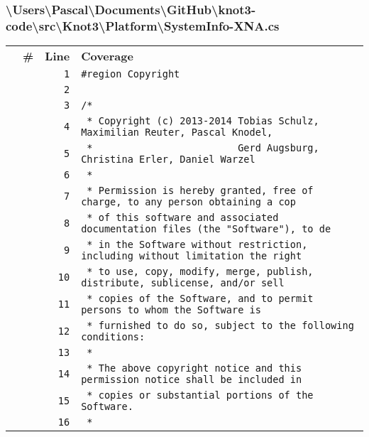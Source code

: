 \documentclass[a4paper,10pt]{article}
\begin{document}
\subsubsection{\textbackslash Users\textbackslash Pascal\textbackslash Documents\textbackslash GitHub\textbackslash knot3-code\textbackslash src\textbackslash Knot3\textbackslash Platform\textbackslash SystemInfo-XNA.cs}
\begin{longtable}[l]{lrrl}
\textbf{} & \textbf{\#} & \textbf{Line} & \textbf{Coverage}\\
\cellcolor{gray} &  & \verb~1~ & \verb~#region Copyright~\\
\cellcolor{gray} &  & \verb~2~ & \verb~~\\
\cellcolor{gray} &  & \verb~3~ & \verb~/*~\\
\cellcolor{gray} &  & \verb~4~ & \verb~ * Copyright (c) 2013-2014 Tobias Schulz, Maximilian Reuter, Pascal Knodel,~\\
\cellcolor{gray} &  & \verb~5~ & \verb~ *                         Gerd Augsburg, Christina Erler, Daniel Warzel~\\
\cellcolor{gray} &  & \verb~6~ & \verb~ *~\\
\cellcolor{gray} &  & \verb~7~ & \verb~ * Permission is hereby granted, free of charge, to any person obtaining a cop~\\
\cellcolor{gray} &  & \verb~8~ & \verb~ * of this software and associated documentation files (the "Software"), to de~\\
\cellcolor{gray} &  & \verb~9~ & \verb~ * in the Software without restriction, including without limitation the right~\\
\cellcolor{gray} &  & \verb~10~ & \verb~ * to use, copy, modify, merge, publish, distribute, sublicense, and/or sell~\\
\cellcolor{gray} &  & \verb~11~ & \verb~ * copies of the Software, and to permit persons to whom the Software is~\\
\cellcolor{gray} &  & \verb~12~ & \verb~ * furnished to do so, subject to the following conditions:~\\
\cellcolor{gray} &  & \verb~13~ & \verb~ *~\\
\cellcolor{gray} &  & \verb~14~ & \verb~ * The above copyright notice and this permission notice shall be included in ~\\
\cellcolor{gray} &  & \verb~15~ & \verb~ * copies or substantial portions of the Software.~\\
\cellcolor{gray} &  & \verb~16~ & \verb~ *~\\

\end{longtable}
\end{document}
